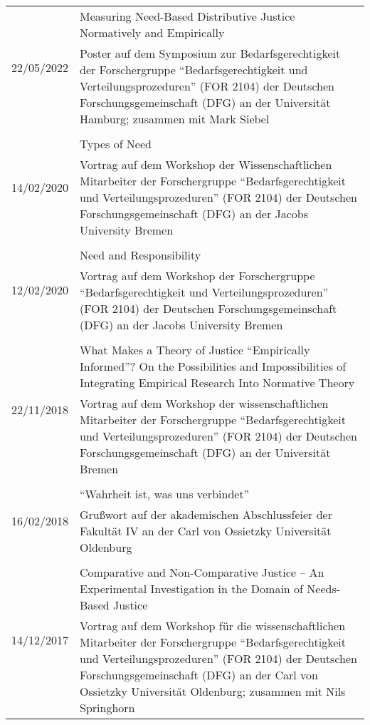 \documentclass[a4paper,10pt]{article}
\begin{document}
\begin{longtable}{p{}p{}}
\multirow{2}{1,75cm}{\footnotesize{22/05/2022}} & Measuring Need-Based Distributive Justice Normatively and Empirically\\
& \footnotesize{Poster auf dem Symposium zur Bedarfsgerechtigkeit der Forschergruppe \enquote{Bedarfsgerechtigkeit und Verteilungsprozeduren} (FOR 2104) der Deutschen Forschungsgemeinschaft (DFG) an der Universität Hamburg; zusammen mit Mark Siebel}\\
\\
\multirow{2}{1,75cm}{\footnotesize{14/02/2020}} & Types of Need\\
& \footnotesize{Vortrag auf dem Workshop der Wissenschaftlichen Mitarbeiter der Forschergruppe \enquote{Bedarfsgerechtigkeit und Verteilungsprozeduren} (FOR 2104) der Deutschen Forschungsgemeinschaft (DFG) an der Jacobs University Bremen}\\
\\
\multirow{2}{1,75cm}{\footnotesize{12/02/2020}} & Need and Responsibility\\
& \footnotesize{Vortrag auf dem Workshop der Forschergruppe \enquote{Bedarfsgerechtigkeit und Verteilungsprozeduren} (FOR 2104) der Deutschen Forschungsgemeinschaft (DFG) an der Jacobs University Bremen}\\
\\
\multirow{2}{1,75cm}{\footnotesize{22/11/2018}} & What Makes a Theory of Justice \enquote{Empirically Informed}? On the Possibilities and Impossibilities of Integrating Empirical Research Into Normative Theory\\
& \footnotesize{Vortrag auf dem Workshop der wissenschaftlichen Mitarbeiter der Forschergruppe \enquote{Bedarfsgerechtigkeit und Verteilungsprozeduren} (FOR 2104) der Deutschen Forschungsgemeinschaft (DFG) an der Universität Bremen}\\
\\
\multirow{2}{1,75cm}{\footnotesize{16/02/2018}} & \enquote{Wahrheit ist, was uns verbindet}\\
& \footnotesize{Grußwort auf der akademischen Abschlussfeier der Fakultät IV an der Carl von Ossietzky Universität Oldenburg}\\
\\
\multirow{2}{1,75cm}{\footnotesize{14/12/2017}} & Comparative and Non-Comparative Justice -- An Experimental Investigation in the Domain of Needs-Based Justice\\
& \footnotesize{Vortrag auf dem Workshop für die wissenschaftlichen Mitarbeiter der Forschergruppe \enquote{Bedarfsgerechtigkeit und Verteilungsprozeduren} (FOR 2104) der Deutschen Forschungsgemeinschaft (DFG) an der Carl von Ossietzky Universität Oldenburg; zusammen mit Nils Springhorn}\\

\end{longtable}
\end{document}
